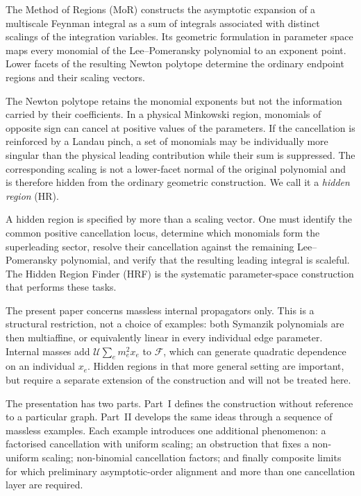 \documentclass[a4paper,11pt]{article}
\begin{document}
The Method of Regions (MoR) constructs the asymptotic expansion of a
multiscale Feynman integral as a sum of integrals associated with distinct
scalings of the integration variables.  Its geometric formulation in
parameter space maps every monomial of the Lee--Pomeransky polynomial to an
exponent point.  Lower facets of the resulting Newton polytope determine the
ordinary endpoint regions and their scaling vectors.

The Newton polytope retains the monomial exponents but not the information
carried by their coefficients.  In a physical Minkowski region, monomials of
opposite sign can cancel at positive values of the parameters.  If the
cancellation is reinforced by a Landau pinch, a set of monomials may be
individually more singular than the physical leading contribution while
their sum is suppressed.  The corresponding scaling is not a lower-facet
normal of the original polynomial and is therefore hidden from the ordinary
geometric construction.  We call it a \emph{hidden region} (HR).

A hidden region is specified by more than a scaling vector.  One must
identify the common positive cancellation locus, determine which monomials
form the superleading sector, resolve their cancellation against the
remaining Lee--Pomeransky polynomial, and verify that the resulting leading
integral is scaleful.  The Hidden Region Finder (HRF) is the systematic
parameter-space construction that performs these tasks.

The present paper concerns massless internal propagators only.  This is a
structural restriction, not a choice of examples: both Symanzik polynomials
are then multiaffine, or equivalently linear in every individual edge
parameter.  Internal masses add
\(\mathcal U\sum_e m_e^2x_e\) to \(\mathcal F\), which can generate
quadratic dependence on an individual \(x_e\).  Hidden regions in that more
general setting are important, but require a separate extension of the
construction and will not be treated here.

The presentation has two parts.  Part~I defines the construction without
reference to a particular graph.  Part~II develops the same ideas through a
sequence of massless examples.  Each example introduces one additional
phenomenon: a factorised cancellation with uniform scaling; an obstruction
that fixes a non-uniform scaling; non-binomial cancellation factors; and
finally composite limits for which preliminary asymptotic-order alignment and more than one
cancellation layer are required.
\end{document}
